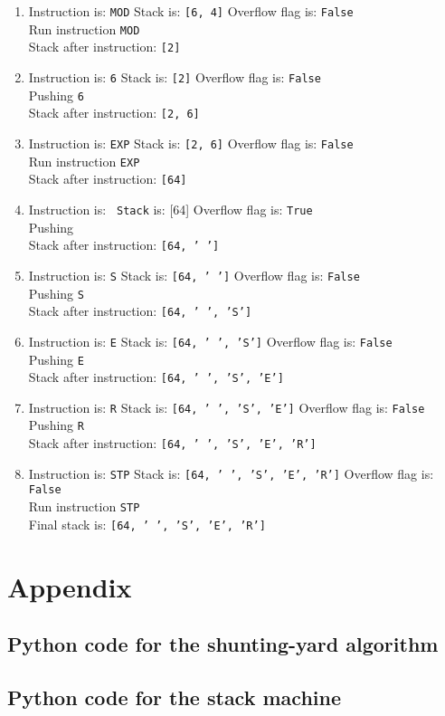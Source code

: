 \begin{enumerate}
\item Instruction is: \texttt{MOD} Stack is: \texttt{[6, 4]} Overflow flag is: \texttt{False}\\
	Run instruction \texttt{MOD}\\
	Stack after instruction:  \texttt{[2]}
\item Instruction is: \texttt{6} Stack is: \texttt{[2]} Overflow flag is: \texttt{False}\\
	Pushing \texttt{6}\\
	Stack after instruction:  \texttt{[2, 6]}
\item Instruction is: \texttt{EXP} Stack is: \texttt{[2, 6]} Overflow flag is: \texttt{False}\\
	Run instruction \texttt{EXP}\\
	Stack after instruction:  \texttt{[64]}
\item Instruction is: \texttt{  Stack} is: [64]\texttt{} Overflow flag is: \texttt{True}\\
	Pushing \texttt{ }\\
	Stack after instruction:  \texttt{[64, ' ']}
\item Instruction is: \texttt{S} Stack is: \texttt{[64, ' ']} Overflow flag is: \texttt{False}\\
	Pushing \texttt{S}\\
	Stack after instruction:  \texttt{[64, ' ', 'S']}
\item Instruction is: \texttt{E} Stack is: \texttt{[64, ' ', 'S']} Overflow flag is: \texttt{False}\\
	Pushing \texttt{E}\\
	Stack after instruction:  \texttt{[64, ' ', 'S', 'E']}
\item Instruction is: \texttt{R} Stack is: \texttt{[64, ' ', 'S', 'E']} Overflow flag is: \texttt{False}\\
	Pushing \texttt{R}\\
	Stack after instruction:  \texttt{[64, ' ', 'S', 'E', 'R']}
\item Instruction is: \texttt{STP} Stack is: \texttt{[64, ' ', 'S', 'E', 'R']} Overflow flag is: \texttt{False}\\
	Run instruction \texttt{STP}\\
Final stack is:  \texttt{[64, ' ', 'S', 'E', 'R']}
\end{enumerate}




\section*{Appendix}
\subsection*{Python code for the shunting-yard algorithm}

\subsection*{Python code for the stack machine}


